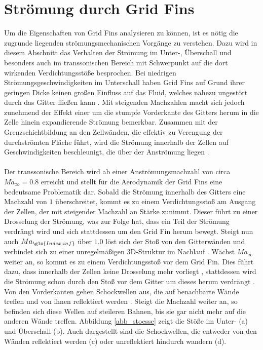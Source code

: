 \section{Strömung durch Grid Fins}\label{stroe}
Um die Eigenschaften von Grid Fins analysieren zu können, ist es nötig die zugrunde liegenden strömungsmechanischen Vorgänge zu verstehen. Dazu wird in diesem Abschnitt das Verhalten der Strömung im Unter-, Überschall und besonders auch im transsonischen Bereich mit Schwerpunkt auf die dort wirkenden Verdichtungsstöße besprochen.
Bei niedrigen Strömungsgeschwindigkeiten im Unterschall haben Grid Fins auf Grund ihrer geringen Dicke keinen großen Einfluss auf das Fluid, welches nahezu ungestört durch das Gitter fließen kann \cite{sb-sharp}. Mit steigenden Machzahlen macht sich jedoch zunehmend der Effekt einer um die stumpfe Vorderkante des Gitters herum in die Zelle hinein expandierende Strömung bemerkbar. Zusammen mit der Grenzschichtbildung an den Zellwänden, die effektiv zu Verengung der durchströmten Fläche führt, wird die Strömung innerhalb der Zellen auf Geschwindigkeiten beschleunigt, die über der Anströmung liegen \cite{synopsis}.
\\~\\
Der transsonische Bereich wird ab einer Anströmungsmachzahl von circa $Ma_\infty=0.8$ erreicht \cite{machgrenzen} und stellt für die Aerodynamik der Grid Fins eine bedeutsame Problematik dar. Sobald die Strömung innerhalb des Gitters eine Machzahl von $1$ überschreitet, kommt es zu einem Verdichtungsstoß am Ausgang der Zellen, der mit steigender Machzahl an Stärke zunimmt. Dieser führt zu einer Drosselung der Strömung, was zur Folge hat, dass ein Teil der Strömung verdrängt wird und sich stattdessen um den Grid Fin herum bewegt. Steigt nun auch $Ma_{\gls{Index:inf}}$ über $1.0$ löst sich der Stoß von den Gitterwänden und verbindet sich zu einer unregelmäßigen 3D-Struktur im Nachlauf \cite{stroemung}. Wächst $Ma_\infty$ weiter an, so kommt es zu einem Verdichtungsstoß vor dem Grid Fin. Dies führt dazu, dass innerhalb der Zellen keine Drosselung mehr vorliegt \cite{stroemung}, stattdessen wird die Strömung schon durch den Stoß vor dem Gitter um dieses herum verdrängt \cite{synopsis}. Von den Vorderkanten gehen Schockwellen aus, die auf benachbarte Wände treffen und von ihnen reflektiert werden \cite{synopsis}. Steigt die Machzahl weiter an, so befinden sich diese Wellen auf steileren Bahnen, bis sie gar nicht mehr auf die anderen Wände treffen. Abbildung \ref{abb_stoesse} zeigt die Stöße im Unter- (a) und Überschall (b). Auch dargestellt sind die Schockwellen, die entweder von den Wänden reflektiert werden (c) oder unreflektiert hindurch wandern (d).

